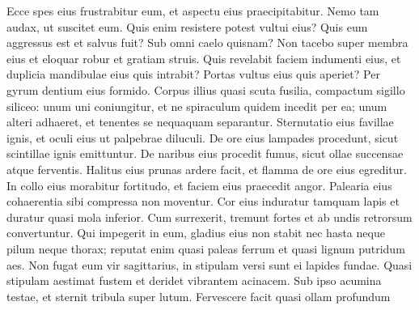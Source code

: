 \begin{biblechapter}
\begin{biblechapter}
\begin{biblechapter}
\begin{biblechapter}
\begin{biblechapter}
\begin{biblechapter}
\begin{biblechapter}
\begin{biblechapter}
\begin{biblechapter}
\begin{biblechapter}
\begin{biblechapter}
\begin{biblechapter}
\begin{biblechapter}
\begin{biblechapter}
\begin{biblechapter}
\begin{biblechapter}
\begin{biblechapter}
\begin{biblechapter}
\begin{biblechapter}
\begin{biblechapter}
\begin{biblechapter}
\begin{biblechapter}
\begin{biblechapter}
\begin{biblechapter}
\begin{biblechapter}
\begin{biblechapter}
\begin{biblechapter}
\begin{biblechapter}
\begin{biblechapter}
\begin{biblechapter}
\begin{biblechapter}
\begin{biblechapter}
\begin{biblechapter}
\begin{biblechapter}
\begin{biblechapter}
\begin{biblechapter}
\begin{biblechapter}
\begin{biblechapter}
\begin{biblechapter}
\begin{biblechapter}
\begin{biblechapter}
\verse Ecce spes eius frustrabitur eum,
 et aspectu eius praecipitabitur.
 \verse Nemo tam audax, ut suscitet eum.
 Quis enim resistere potest vultui eius?
 \verse Quis eum aggressus est et salvus fuit?
 Sub omni caelo quisnam?
 \verse Non tacebo super membra eius
 et eloquar robur et gratiam struis. 
\verse Quis revelabit faciem indumenti eius,
 et duplicia mandibulae eius quis intrabit?
 \verse Portas vultus eius quis aperiet?
 Per gyrum dentium eius formido.
 \verse Corpus illius quasi scuta fusilia,
 compactum sigillo siliceo:
 \verse unum uni coniungitur,
 et ne spiraculum quidem incedit per ea;
 \verse unum alteri adhaeret,
 et tenentes se nequaquam separantur.
 \verse Sternutatio eius favillae ignis,
 et oculi eius ut palpebrae diluculi.
 \verse De ore eius lampades procedunt,
 sicut scintillae ignis emittuntur.
 \verse De naribus eius procedit fumus,
 sicut ollae succensae atque ferventis.
 \verse Halitus eius prunas ardere facit,
 et flamma de ore eius egreditur.
 \verse In collo eius morabitur fortitudo,
 et faciem eius praecedit angor.
 \verse Palearia eius cohaerentia sibi
 compressa non moventur.
 \verse Cor eius induratur tamquam lapis
 et duratur quasi mola inferior.
 \verse Cum surrexerit, tremunt fortes
 et ab undis retrorsum convertuntur.
 \verse Qui impegerit in eum, gladius eius non stabit
 nec hasta neque pilum neque thorax;
 \verse reputat enim quasi paleas ferrum
 et quasi lignum putridum aes.
 \verse Non fugat eum vir sagittarius,
 in stipulam versi sunt ei lapides fundae.
 \verse Quasi stipulam aestimat fustem
 et deridet vibrantem acinacem.
 \verse Sub ipso acumina testae,
 et sternit tribula super lutum.
 \verse Fervescere facit quasi ollam profundum

\end{biblechapter}
\end{biblechapter}
\end{biblechapter}
\end{biblechapter}
\end{biblechapter}
\end{biblechapter}
\end{biblechapter}
\end{biblechapter}
\end{biblechapter}
\end{biblechapter}
\end{biblechapter}
\end{biblechapter}
\end{biblechapter}
\end{biblechapter}
\end{biblechapter}
\end{biblechapter}
\end{biblechapter}
\end{biblechapter}
\end{biblechapter}
\end{biblechapter}
\end{biblechapter}
\end{biblechapter}
\end{biblechapter}
\end{biblechapter}
\end{biblechapter}
\end{biblechapter}
\end{biblechapter}
\end{biblechapter}
\end{biblechapter}
\end{biblechapter}
\end{biblechapter}
\end{biblechapter}
\end{biblechapter}
\end{biblechapter}
\end{biblechapter}
\end{biblechapter}
\end{biblechapter}
\end{biblechapter}
\end{biblechapter}
\end{biblechapter}
\end{biblechapter}
